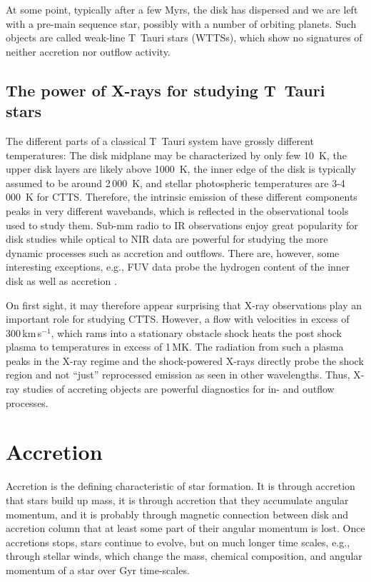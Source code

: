 \documentclass[graybox, nosecnum]{svmult}
\begin{document}
At some point, typically after a few Myrs, the disk has dispersed \citep{2009AIPC.1158....3M} and we are left with a pre-main sequence star, possibly with a number of orbiting planets. Such objects are called weak-line T~Tauri stars (WTTSs), which show no signatures of neither accretion nor outflow activity.

\subsection{The power of X-rays for studying T~Tauri stars}
The different parts of a classical T~Tauri system have grossly different temperatures: The disk midplane may be characterized by only few 10~K, the upper disk layers are likely above 1000~K, the inner edge of the disk is typically assumed to be around 2\,000~K, and stellar photospheric temperatures are 3-4\,000~K for CTTS. Therefore, the intrinsic emission of these different components peaks in very different wavebands, which is reflected in the observational tools used to study them. Sub-mm radio to IR observations enjoy great popularity for disk studies while optical to NIR data are powerful for studying the more dynamic processes such as accretion and outflows. There are, however, some interesting exceptions, e.g., FUV data probe the hydrogen content of the inner disk as well as accretion \citep[see review in][]{Schneider_2020}.

On first sight, it may therefore appear surprising that X-ray observations play an important role for studying CTTS. However, a flow with velocities in excess of 300\,km\,s$^{-1}$, which rams into a stationary obstacle shock heats the post shock plasma to temperatures in excess of 1\,MK. The radiation from such a plasma peaks in the X-ray regime and the shock-powered X-rays directly probe the shock region and not ``just'' reprocessed emission as seen in other wavelengths. Thus,  X-ray studies of accreting objects are powerful diagnostics for in- and outflow processes. 






\section{Accretion \label{sect:accretion}}

Accretion is the defining characteristic of star formation. It is through accretion that stars build up mass, it is through accretion that they accumulate angular momentum, and it is probably through magnetic connection between disk and accretion column that at least some part of their angular momentum is lost. Once accretions stops, stars continue to evolve, but on much longer time scales, e.g., through stellar winds, which change the mass, chemical composition, and angular momentum of a star over Gyr time-scales.
\end{document}
